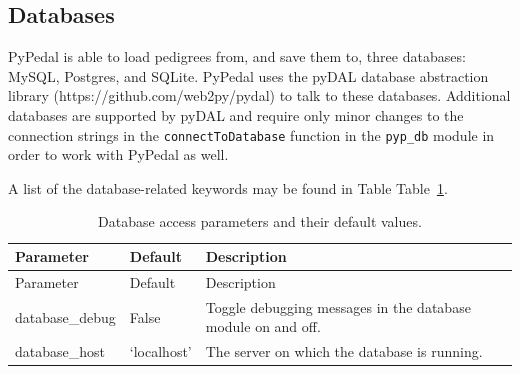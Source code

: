 \documentclass[
  letterpaper,
  DIV=11,
  numbers=noendperiod]{scrreprt}
\begin{document}
\subsection{Databases}\label{databases}

PyPedal is able to load pedigrees from, and save them to, three
databases: MySQL, Postgres, and SQLite. PyPedal uses the pyDAL database
abstraction library (https://github.com/web2py/pydal) to talk to these
databases. Additional databases are supported by pyDAL and require only
minor changes to the connection strings in the
\texttt{connectToDatabase} function in the \texttt{pyp\_db} module in
order to work with PyPedal as well.

A list of the database-related keywords may be found in Table
Table~\ref{tbl-database-parameters}.

\begin{longtable}[]{@{}
  >{\raggedright\arraybackslash}p{}
  >{\raggedright\arraybackslash}p{}
  >{\raggedright\arraybackslash}p{}@{}}
\caption{Database access parameters and their default
values.}\label{tbl-database-parameters}\tabularnewline
\toprule\noalign{}
\begin{minipage}[b]{\linewidth}\raggedright
Parameter
\end{minipage} & \begin{minipage}[b]{\linewidth}\raggedright
Default
\end{minipage} & \begin{minipage}[b]{\linewidth}\raggedright
Description
\end{minipage} \\
\midrule\noalign{}
\endfirsthead
\toprule\noalign{}
\begin{minipage}[b]{\linewidth}\raggedright
Parameter
\end{minipage} & \begin{minipage}[b]{\linewidth}\raggedright
Default
\end{minipage} & \begin{minipage}[b]{\linewidth}\raggedright
Description
\end{minipage} \\
\midrule\noalign{}
\endhead
\bottomrule\noalign{}
\endlastfoot
database\_debug & False & Toggle debugging messages in the database
module on and off. \\
database\_host & `localhost' & The server on which the database is
running. \\

\end{longtable}
\end{document}
